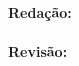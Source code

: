 %

\begin{adjustwidth}{0pt}{0.2\textwidth}
	\begin{flushleft}
		\textbf{Redação:}\\
		\equipaRedatora\\
		\bigskip
		\textbf{Revisão:}\\
		\equipaRevisora
	\end{flushleft}
\end{adjustwidth}